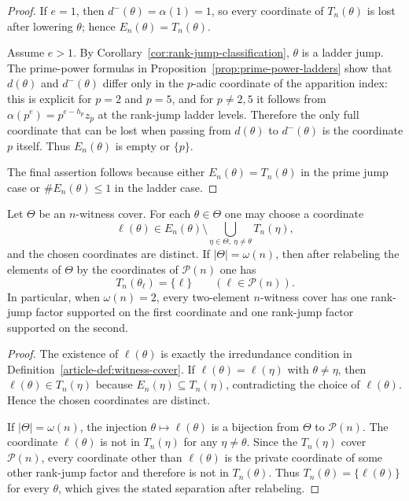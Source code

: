 \begin{proof}
If $e=1$, then $d^-(\theta)=\alpha(1)=1$, so every coordinate of
$T_n(\theta)$ is lost after lowering $\theta$; hence
$E_n(\theta)=T_n(\theta)$.

Assume $e>1$. By Corollary~\ref{cor:rank-jump-classification}, $\theta$ is a
ladder jump. The prime-power formulas in
Proposition~\ref{prop:prime-power-ladders} show that
$d(\theta)$ and $d^-(\theta)$ differ only in the $p$-adic coordinate of the
apparition index: this is explicit for $p=2$ and $p=5$, and for
$p\ne2,5$ it follows from
$\alpha(p^e)=p^{e-h_p}z_p$ at the rank-jump ladder levels. Therefore the only
full coordinate that can be lost when
passing from $d(\theta)$ to $d^-(\theta)$ is the coordinate $p$ itself.
Thus $E_n(\theta)$ is empty or $\{p\}$.

The final assertion follows because either $E_n(\theta)=T_n(\theta)$ in
the prime jump case or $\#E_n(\theta)\le1$ in the ladder case.
\end{proof}

\begin{lemma}\label{thm:extremal-coordinate-separation}
Let $\Theta$ be an $n$-witness cover. For each
$\theta\in\Theta$ one may choose a coordinate
\[
\ell(\theta)\in
E_n(\theta)\setminus\bigcup_{\eta\in\Theta,\ \eta\ne\theta}T_n(\eta),
\]
and the chosen coordinates are distinct. If
$|\Theta|=\omega(n)$, then after relabeling the elements of $\Theta$ by
the coordinates of $\mathcal P(n)$ one has
\[
T_n(\theta_\ell)=\{\ell\}\qquad(\ell\in\mathcal P(n)).
\]
In particular, when $\omega(n)=2$, every two-element $n$-witness cover has
one rank-jump factor supported on the first coordinate and one rank-jump factor supported on the
second.
\end{lemma}

\begin{proof}
The existence of $\ell(\theta)$ is exactly the irredundance condition in
Definition~\ref{article-def:witness-cover}. If
$\ell(\theta)=\ell(\eta)$ with $\theta\ne\eta$, then
$\ell(\theta)\in T_n(\eta)$ because
$E_n(\eta)\subseteq T_n(\eta)$, contradicting the choice of
$\ell(\theta)$. Hence the chosen coordinates are distinct.

If $|\Theta|=\omega(n)$, the injection
$\theta\mapsto\ell(\theta)$ is a bijection from $\Theta$ to
$\mathcal P(n)$. The coordinate $\ell(\theta)$ is not in
$T_n(\eta)$ for any $\eta\ne\theta$. Since the $T_n(\eta)$ cover
$\mathcal P(n)$, every coordinate other than $\ell(\theta)$ is the private
coordinate of some other rank-jump factor and therefore is not in $T_n(\theta)$. Thus
$T_n(\theta)=\{\ell(\theta)\}$ for every $\theta$, which gives the stated
separation after relabeling.
\end{proof}

